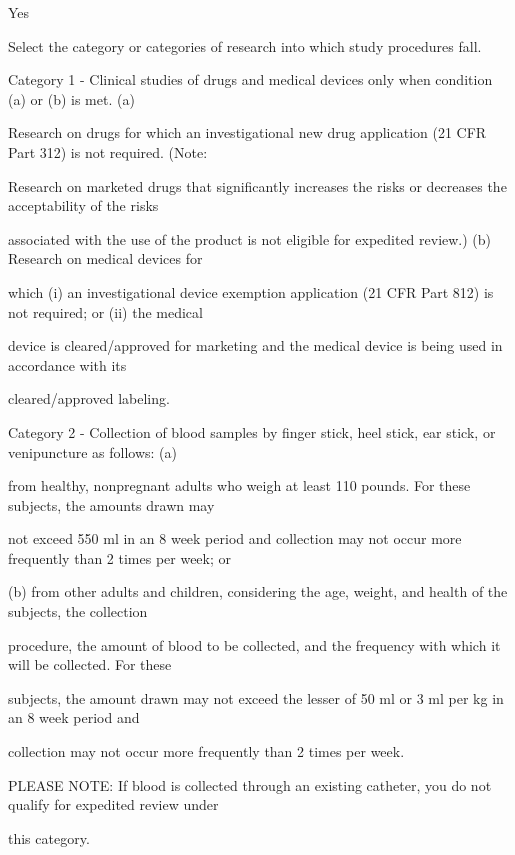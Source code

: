 \documentclass[10pt, letterpaper]{article}
\begin{document}
Yes

\begin{responsebox}

Select the category or categories of research into which study procedures fall.

\end{responsebox}

\noindent \makebox[0pt][l]{$\square$}\hspace{1.2em} Category 1 - Clinical studies of drugs and medical devices only when condition (a) or (b) is met. (a)

\begin{responsebox}

Research on drugs for which an investigational new drug application (21 CFR Part 312) is not required. (Note:

Research on marketed drugs that significantly increases the risks or decreases the acceptability of the risks

associated with the use of the product is not eligible for expedited review.) (b) Research on medical devices for

which (i) an investigational device exemption application (21 CFR Part 812) is not required; or (ii) the medical

device is cleared/approved for marketing and the medical device is being used in accordance with its

cleared/approved labeling.

\end{responsebox}

\noindent \makebox[0pt][l]{$\square$}\hspace{1.2em} Category 2 - Collection of blood samples by finger stick, heel stick, ear stick, or venipuncture as follows: (a)

\begin{responsebox}

from healthy, nonpregnant adults who weigh at least 110 pounds. For these subjects, the amounts drawn may

not exceed 550 ml in an 8 week period and collection may not occur more frequently than 2 times per week; or

(b) from other adults and children, considering the age, weight, and health of the subjects, the collection

procedure, the amount of blood to be collected, and the frequency with which it will be collected. For these

subjects, the amount drawn may not exceed the lesser of 50 ml or 3 ml per kg in an 8 week period and

collection may not occur more frequently than 2 times per week.

\vspace{0.5em}

\vspace{0.5em}

PLEASE NOTE: If blood is collected through an existing catheter, you do not qualify for expedited review under

this category.

\end{responsebox}
\end{document}
